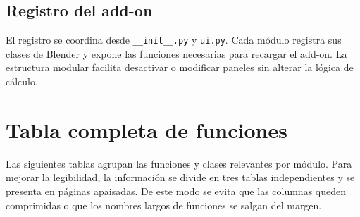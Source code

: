 \subsection{Registro del add-on}
\label{subsec:d-analisis-registro}

El registro se coordina desde \texttt{\_\_init\_\_.py} y \texttt{ui.py}. Cada módulo registra sus clases de Blender y expone las funciones necesarias para recargar el add-on. La estructura modular facilita desactivar o modificar paneles sin alterar la lógica de cálculo.


\section{Tabla completa de funciones}
\label{sec:d-tabla-funciones}

Las siguientes tablas agrupan las funciones y clases relevantes por módulo. Para mejorar la legibilidad, la información se divide en tres tablas independientes y se presenta en páginas apaisadas. De este modo se evita que las columnas queden comprimidas o que los nombres largos de funciones se salgan del margen.

